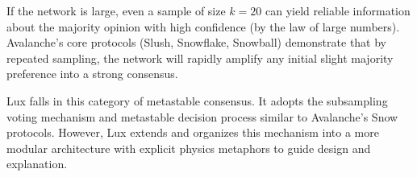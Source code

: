 If the network is large, even a sample of size $k=20$ can yield reliable information about the majority opinion with high confidence (by the law of large numbers). Avalanche's core protocols (Slush, Snowflake, Snowball) demonstrate that by repeated sampling, the network will rapidly amplify any initial slight majority preference into a strong consensus.

Lux falls in this category of metastable consensus. It adopts the subsampling voting mechanism and metastable decision process similar to Avalanche's Snow protocols. However, Lux extends and organizes this mechanism into a more modular architecture with explicit physics metaphors to guide design and explanation.